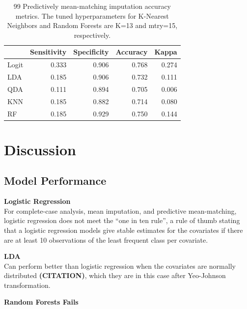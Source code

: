 \documentclass[12pt,]{article}
\begin{document}
\begin{table}[!h]

\caption{\label{tab:unnamed-chunk-8}\label{tab:pmm99-metrics} 99 Predictively mean-matching imputation accuracy metrics.  The tuned hyperparameters for K-Nearest Neighbors and Random Forests are K=13 and mtry=15, respectively.}
\centering
\fontsize{10}{12}\selectfont
\begin{tabular}{lrrrr}
\toprule
  & Sensitivity & Specificity & Accuracy & Kappa\\
\midrule
Logit & 0.333 & 0.906 & 0.768 & 0.274\\
LDA & 0.185 & 0.906 & 0.732 & 0.111\\
QDA & 0.111 & 0.894 & 0.705 & 0.006\\
KNN & 0.185 & 0.882 & 0.714 & 0.080\\
RF & 0.185 & 0.929 & 0.750 & 0.144\\
\bottomrule
\end{tabular}
\end{table}

\newpage

\section{Discussion}\label{discussion}

\subsection{Model Performance}\label{model-performance}

\textbf{Logistic Regression}\\
For complete-case analysis, mean imputation, and predictive
mean-matching, logistic regression does not meet the ``one in ten
rule'', a rule of thumb stating that a logistic regression models give
stable estimates for the covariates if there are at least 10
observations of the least frequent class per covariate.

\textbf{LDA}\\
Can perform better than logistic regression when the covariates are
normally distributed \textbf{(CITATION)}, which they are in this case
after Yeo-Johnson transformation.

\textbf{Random Forests Fails}
\end{document}
